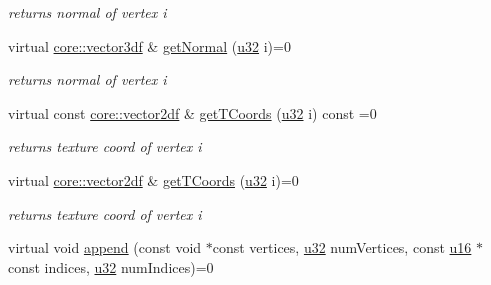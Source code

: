 \begin{DoxyCompactItemize}
\begin{DoxyCompactList}\small\item\em returns normal of vertex i \end{DoxyCompactList}\item 
\mbox{\label{classirr_1_1scene_1_1IMeshBuffer_ad6d76e91bbd61ee8084d5c9b64bb1239}} 
virtual \hyperlink{namespaceirr_1_1core_a06f169d08b5c429f5575acb7edbad811}{core\+::vector3df} \& \hyperlink{classirr_1_1scene_1_1IMeshBuffer_ad6d76e91bbd61ee8084d5c9b64bb1239}{get\+Normal} (\hyperlink{namespaceirr_a0416a53257075833e7002efd0a18e804}{u32} i)=0
\begin{DoxyCompactList}\small\item\em returns normal of vertex i \end{DoxyCompactList}\item 
\mbox{\label{classirr_1_1scene_1_1IMeshBuffer_a44e1fd7a1a3cb35492ebb556833514ed}} 
virtual const \hyperlink{namespaceirr_1_1core_a2cf08556d77f6f5a792973a6e27ed11b}{core\+::vector2df} \& \hyperlink{classirr_1_1scene_1_1IMeshBuffer_a44e1fd7a1a3cb35492ebb556833514ed}{get\+T\+Coords} (\hyperlink{namespaceirr_a0416a53257075833e7002efd0a18e804}{u32} i) const =0
\begin{DoxyCompactList}\small\item\em returns texture coord of vertex i \end{DoxyCompactList}\item 
\mbox{\label{classirr_1_1scene_1_1IMeshBuffer_adf5f493e53fe6a23aa27c395527ea6ee}} 
virtual \hyperlink{namespaceirr_1_1core_a2cf08556d77f6f5a792973a6e27ed11b}{core\+::vector2df} \& \hyperlink{classirr_1_1scene_1_1IMeshBuffer_adf5f493e53fe6a23aa27c395527ea6ee}{get\+T\+Coords} (\hyperlink{namespaceirr_a0416a53257075833e7002efd0a18e804}{u32} i)=0
\begin{DoxyCompactList}\small\item\em returns texture coord of vertex i \end{DoxyCompactList}\item 
virtual void \hyperlink{classirr_1_1scene_1_1IMeshBuffer_ac9e9d7fbb10175cc6f1596ba3fe4e8f9}{append} (const void $\ast$const vertices, \hyperlink{namespaceirr_a0416a53257075833e7002efd0a18e804}{u32} num\+Vertices, const \hyperlink{namespaceirr_ae9f8ec82692ad3b83c21f555bfa70bcc}{u16} $\ast$const indices, \hyperlink{namespaceirr_a0416a53257075833e7002efd0a18e804}{u32} num\+Indices)=0

\end{DoxyCompactItemize}
